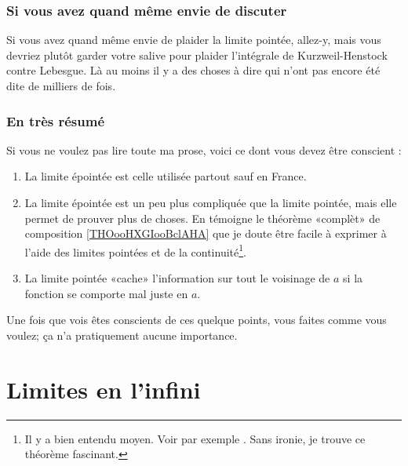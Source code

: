 \subsubsection{Si vous avez quand même envie de discuter}

Si vous avez quand même envie de plaider la limite pointée, allez-y, mais vous devriez plutôt garder votre salive pour plaider l'intégrale de Kurzweil-Henstock\cite{BIBooLGJXooZhEXJf} contre Lebesgue. Là au moins il y a des choses à dire qui n'ont pas encore été dite de milliers de fois.

\subsubsection{En très résumé}

Si vous ne voulez pas lire toute ma prose, voici ce dont vous devez être conscient :
\begin{enumerate}
	\item
	      La limite épointée est celle utilisée partout sauf en France.
	\item
	      La limite épointée est un peu plus compliquée que la limite pointée, mais elle permet de prouver plus de choses. En témoigne le théorème «complèt» de composition \ref{THOooHXGIooBclAHA} que je doute être facile à exprimer à l'aide des limites pointées et de la continuité\footnote{Il y a bien entendu moyen. Voir par exemple \cite{BIBooDAGXooRltbgK}. Sans ironie, je trouve ce théorème fascinant.}.
	\item
	      La limite pointée «cache» l'information sur tout le voisinage de \( a\) si la fonction se comporte mal juste en \( a\).
\end{enumerate}
Une fois que vois êtes conscients de ces quelque points, vous faites comme vous voulez; ça n'a pratiquement aucune importance.

\section{Limites en l'infini}

